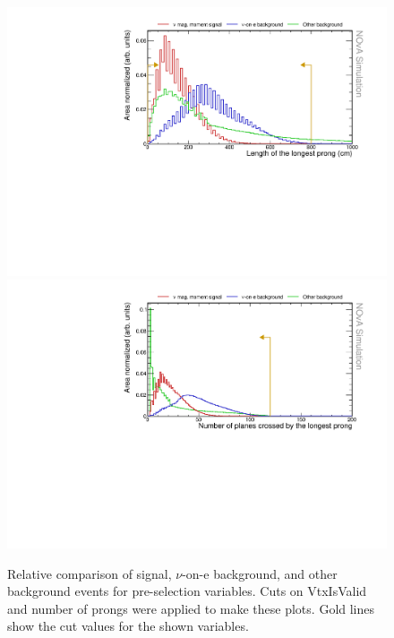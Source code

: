 \begin{figure}[hbtp]
\centering
\includegraphics[width=.9\textwidth]{Plots/NuMMEventSelection/N1Cut_longestProng.pdf}
\includegraphics[width=.9\textwidth]{Plots/NuMMEventSelection/N1Cut_NPlanes.pdf}
\caption{Relative comparison of signal, $\nu$-on-e background, and other background events for pre-selection variables. Cuts on VtxIsValid and number of prongs were applied to make these plots. Gold lines show the cut values for the shown variables.}
\label{fig:PreSelectionCuts1}
\end{figure}

